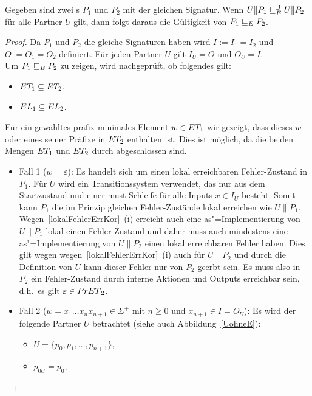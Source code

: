 \begin{Lem}
  \label{KommVerfeinLem}
  Gegeben sind zwei \MEIO{}s $P_1$ und $P_2$ mit der gleichen Signatur. Wenn
  $U\|P_1 \sqsubseteq  _E^\mathrm{B}{} U\|P_2$ für alle Partner $U$ gilt, dann folgt daraus die
  Gültigkeit von $P_1 \sqsubseteq  _E{} P_2$.
\end{Lem}
\begin{proof}
  Da $P_1$ und $P_2$ die gleiche Signaturen haben wird $I:=I_1=I_2$ und
  $O:=O_1=O_2$ definiert. Für jeden Partner $U$ gilt $I_U=O$ und $O_U=I$.\\
  Um $P_1 \sqsubseteq  _E{}P_2$ zu zeigen, wird nachgeprüft, ob folgendes gilt:
  \begin{itemize}
    \item $ET _1\subseteq ET _2$,
    \item $EL _1\subseteq EL _2$.
  \end{itemize}
  Für ein gewähltes präfix-minimales Element $w\in ET _1$ wir gezeigt, dass
  dieses $w$ oder eines seiner Präfixe in $ET _2$ enthalten ist. Dies ist
  möglich, da die beiden Mengen $ET _1$ und $ET _2$ durch \cont{}
  abgeschlossen sind.
  \begin{itemize}
    \item Fall 1 ($w=\varepsilon$): Es handelt sich um einen lokal erreichbaren
      Fehler-Zustand in $P_1$. Für $U$ wird ein Transitionssystem verwendet,
      das nur aus dem Startzustand und einer must-Schleife für alle Inputs
      $x\in I_U$ besteht. Somit kann $P_1$ die im Prinzip gleichen
      Fehler-Zustände lokal erreichen wie $U\|P_1$.
      Wegen~\ref{lokalFehlerErrKor}~(i) erreicht auch eine as"=Implementierung
      von $U\|P_1$ lokal einen Fehler-Zustand und daher muss auch mindestens
      eine as"=Implementierung von $U\|P_2$ einen lokal erreichbaren Fehler
      haben. Dies gilt wegen wegen~\ref{lokalFehlerErrKor}~(i) auch für
      $U\|P_2$ und durch die Definition von $U$ kann dieser Fehler nur von
      $P_2$ geerbt sein. Es muss also in $P_2$ ein Fehler-Zustand durch interne
      Aktionen und Outputs erreichbar sein, d.h.\ es gilt $\varepsilon\in
      PrET{}_2$.
    \item Fall 2 ($w=x_1\dots x_n x_{n+1}\in\Sigma ^+$ mit $n\geq 0$ und
      $x_{n+1}\in I = O_U$): Es wird der folgende Partner $U$ betrachtet (siehe
      auch Abbildung~\ref{UohneE}):
      \begin{itemize}
        \item $U=\{p_0,p_1,\dots ,p_{n+1}\}$,
        \item $p_{0U}=p_0$,

\end{itemize}
\end{itemize}
\end{proof}
